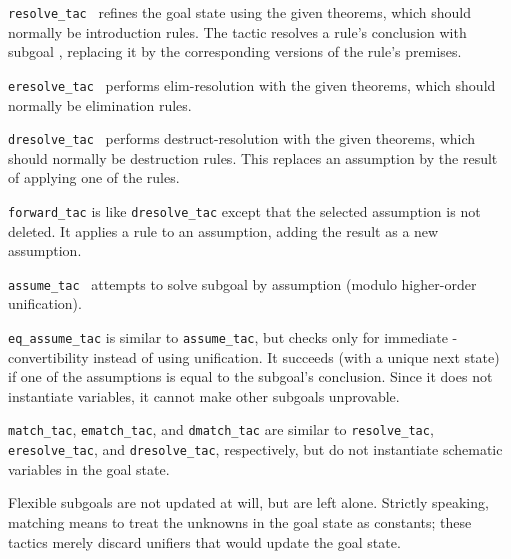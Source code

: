 \begin{isabellebody}
\begin{isamarkuptext}
  \begin{description}

  \item \verb|resolve_tac|~ refines the goal state
  using the given theorems, which should normally be introduction
  rules.  The tactic resolves a rule's conclusion with subgoal , replacing it by the corresponding versions of the rule's
  premises.

  \item \verb|eresolve_tac|~ performs elim-resolution
  with the given theorems, which should normally be elimination rules.

  \item \verb|dresolve_tac|~ performs
  destruct-resolution with the given theorems, which should normally
  be destruction rules.  This replaces an assumption by the result of
  applying one of the rules.

  \item \verb|forward_tac| is like \verb|dresolve_tac| except that the
  selected assumption is not deleted.  It applies a rule to an
  assumption, adding the result as a new assumption.

  \item \verb|assume_tac|~ attempts to solve subgoal 
  by assumption (modulo higher-order unification).

  \item \verb|eq_assume_tac| is similar to \verb|assume_tac|, but checks
  only for immediate \isa{{\isasymalpha}}-convertibility instead of using
  unification.  It succeeds (with a unique next state) if one of the
  assumptions is equal to the subgoal's conclusion.  Since it does not
  instantiate variables, it cannot make other subgoals unprovable.

  \item \verb|match_tac|, \verb|ematch_tac|, and \verb|dmatch_tac| are
  similar to \verb|resolve_tac|, \verb|eresolve_tac|, and \verb|dresolve_tac|, respectively, but do not instantiate schematic
  variables in the goal state.

  Flexible subgoals are not updated at will, but are left alone.
  Strictly speaking, matching means to treat the unknowns in the goal
  state as constants; these tactics merely discard unifiers that would
  update the goal state.


\end{description}
\end{isamarkuptext}
\end{isabellebody}
